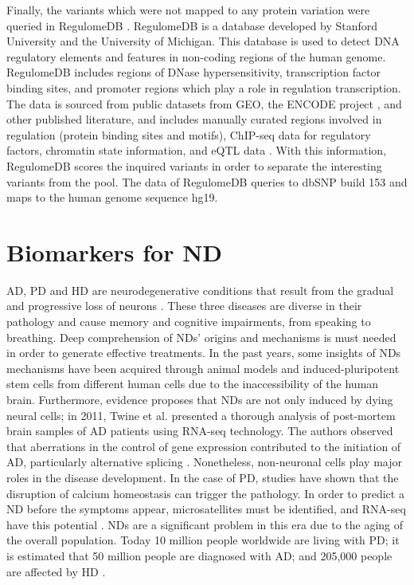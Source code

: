 Finally, the variants which were not mapped to any protein variation were queried in RegulomeDB \cite{regulomedb}. RegulomeDB is a database developed by Stanford University and the University of Michigan. This database is used to detect DNA regulatory elements and features in non-coding regions of the human genome. RegulomeDB includes regions of DNase hypersensitivity, transcription factor binding sites, and promoter regions which play a role in regulation transcription. The data is sourced from public datasets from GEO, the ENCODE project \cite{encode}, and other published literature, and includes manually curated regions involved in regulation (protein binding sites and motifs), ChIP-seq data for regulatory factors, chromatin state information, and eQTL data \cite{regulomedb}. With this information, RegulomeDB scores the inquired variants in order to separate the interesting variants from the pool. The data of RegulomeDB queries to dbSNP build 153 and maps to the human genome sequence hg19.

\section{Biomarkers for ND}

AD, PD and HD are neurodegenerative conditions that result from the gradual and progressive loss of neurons \cite{Costa}. These three diseases are diverse in their pathology and cause memory and cognitive impairments, from speaking to breathing. Deep comprehension of NDs' origins and mechanisms is must needed in order to generate effective treatments. In the past years, some insights of NDs mechanisms have been acquired through animal models and induced-pluripotent stem cells from different human cells due to the inaccessibility of the human brain. Furthermore, evidence proposes that NDs are not only induced by dying neural cells; in 2011, Twine et al. presented a thorough analysis of post-mortem brain samples of AD patients using RNA-seq technology. The authors observed that aberrations in the control of gene expression contributed to the initiation of AD, particularly alternative splicing \cite{Twine}. Nonetheless, non-neuronal cells play major roles in the disease development. In the case of PD, studies have shown that the disruption of calcium homeostasis can trigger the pathology. In order to predict a ND before the symptoms appear, microsatellites must be identified, and RNA-seq have this potential \cite{Gitler}. NDs are a significant problem in this era due to the aging of the overall population. Today 10 million people worldwide are living with PD; it is estimated that 50 million people are diagnosed with AD; and 205,000 people are affected by HD \cite{Marras, WAR, PringsheimHD}.

